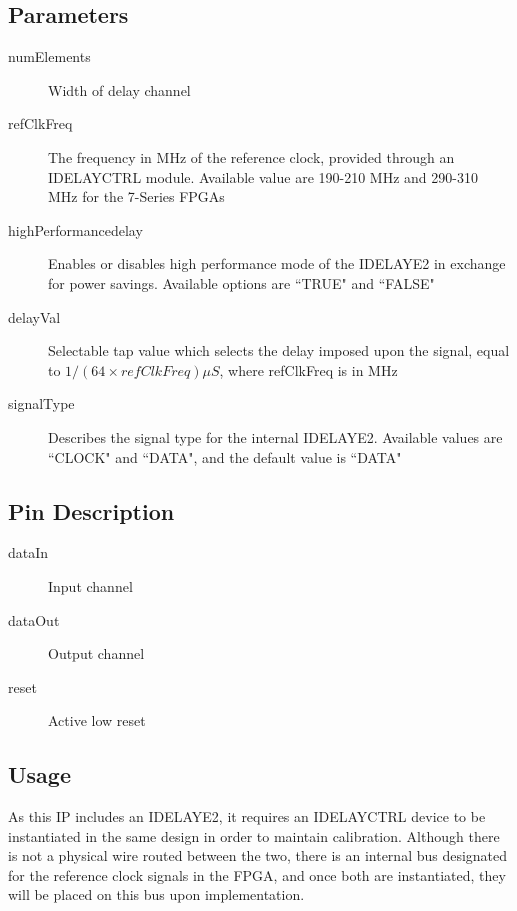 \documentclass[11pt]{article}
\begin{document}
\subsection{Parameters}
\begin{description}
	\item[numElements]Width of delay channel
	\item[refClkFreq]The frequency in MHz of the reference clock, provided through an IDELAYCTRL module. Available value are 190-210 MHz and 290-310 MHz
		for the 7-Series FPGAs
	\item[highPerformance\textunderscore delay]Enables or disables high performance mode of the IDELAYE2 in exchange for power savings. Available options
		are ``TRUE" and ``FALSE"
	\item[delayVal]Selectable tap value which selects the delay imposed upon the signal, equal to $1/(64\times refClkFreq)\mu{}S$, where refClkFreq is
		in MHz
	\item[signalType]Describes the signal type for the internal IDELAYE2. Available values are ``CLOCK" and ``DATA", and the default value is ``DATA"
\end{description}
\subsection{Pin Description}
\begin{description}
	\item[dataIn]Input channel
	\item[dataOut]Output channel
	\item[reset]Active low reset
\end{description}
\subsection{Usage}
As this IP includes an IDELAYE2, it requires an IDELAYCTRL device to be instantiated in the same design in order to maintain calibration. Although there
is not a physical wire routed between the two, there is an internal bus designated for the reference clock signals in the FPGA, and once both are
instantiated, they will be placed on this bus upon implementation.
\end{document}

